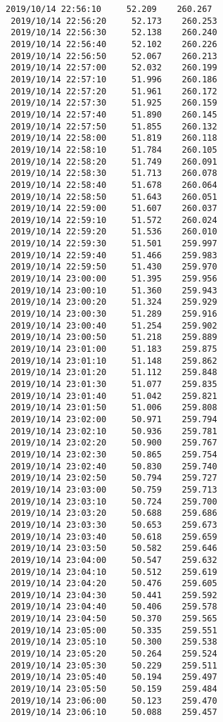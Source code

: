 \documentclass[11pt]{article}
\begin{document}
\begin{Verbatim}[commandchars=\\\{\}]
 2019/10/14 22:56:10     52.209    260.267
 2019/10/14 22:56:20     52.173    260.253
 2019/10/14 22:56:30     52.138    260.240
 2019/10/14 22:56:40     52.102    260.226
 2019/10/14 22:56:50     52.067    260.213
 2019/10/14 22:57:00     52.032    260.199
 2019/10/14 22:57:10     51.996    260.186
 2019/10/14 22:57:20     51.961    260.172
 2019/10/14 22:57:30     51.925    260.159
 2019/10/14 22:57:40     51.890    260.145
 2019/10/14 22:57:50     51.855    260.132
 2019/10/14 22:58:00     51.819    260.118
 2019/10/14 22:58:10     51.784    260.105
 2019/10/14 22:58:20     51.749    260.091
 2019/10/14 22:58:30     51.713    260.078
 2019/10/14 22:58:40     51.678    260.064
 2019/10/14 22:58:50     51.643    260.051
 2019/10/14 22:59:00     51.607    260.037
 2019/10/14 22:59:10     51.572    260.024
 2019/10/14 22:59:20     51.536    260.010
 2019/10/14 22:59:30     51.501    259.997
 2019/10/14 22:59:40     51.466    259.983
 2019/10/14 22:59:50     51.430    259.970
 2019/10/14 23:00:00     51.395    259.956
 2019/10/14 23:00:10     51.360    259.943
 2019/10/14 23:00:20     51.324    259.929
 2019/10/14 23:00:30     51.289    259.916
 2019/10/14 23:00:40     51.254    259.902
 2019/10/14 23:00:50     51.218    259.889
 2019/10/14 23:01:00     51.183    259.875
 2019/10/14 23:01:10     51.148    259.862
 2019/10/14 23:01:20     51.112    259.848
 2019/10/14 23:01:30     51.077    259.835
 2019/10/14 23:01:40     51.042    259.821
 2019/10/14 23:01:50     51.006    259.808
 2019/10/14 23:02:00     50.971    259.794
 2019/10/14 23:02:10     50.936    259.781
 2019/10/14 23:02:20     50.900    259.767
 2019/10/14 23:02:30     50.865    259.754
 2019/10/14 23:02:40     50.830    259.740
 2019/10/14 23:02:50     50.794    259.727
 2019/10/14 23:03:00     50.759    259.713
 2019/10/14 23:03:10     50.724    259.700
 2019/10/14 23:03:20     50.688    259.686
 2019/10/14 23:03:30     50.653    259.673
 2019/10/14 23:03:40     50.618    259.659
 2019/10/14 23:03:50     50.582    259.646
 2019/10/14 23:04:00     50.547    259.632
 2019/10/14 23:04:10     50.512    259.619
 2019/10/14 23:04:20     50.476    259.605
 2019/10/14 23:04:30     50.441    259.592
 2019/10/14 23:04:40     50.406    259.578
 2019/10/14 23:04:50     50.370    259.565
 2019/10/14 23:05:00     50.335    259.551
 2019/10/14 23:05:10     50.300    259.538
 2019/10/14 23:05:20     50.264    259.524
 2019/10/14 23:05:30     50.229    259.511
 2019/10/14 23:05:40     50.194    259.497
 2019/10/14 23:05:50     50.159    259.484
 2019/10/14 23:06:00     50.123    259.470
 2019/10/14 23:06:10     50.088    259.457

\end{Verbatim}
\end{document}
